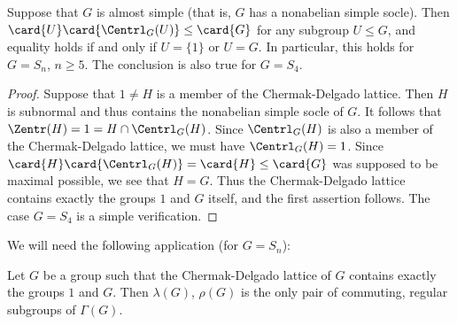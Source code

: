 \begin{lemma}\label{l:sn_cent_est}
    Suppose that $G$ is almost simple
    (that is, $G$ has a nonabelian simple
    socle). 
    Then $\card{U}\card{\Centrl_{G}(U)} \leq \card{G}$
    for any subgroup $U\leq G$,
    and equality holds if and only if
    $U = \{1\}$ or $U=G$.
    In particular, this holds for 
    $G= S_n$, $n\geq 5$.
    The conclusion is also true for $G=S_4$.
\end{lemma}

\begin{proof}
  Suppose that $1\neq H$ is a member of
  the Chermak-Delgado lattice.
  Then $H$ is subnormal and thus contains the nonabelian
  simple socle of $G$.
  It follows that $\Zentr(H)=1 = H \cap \Centrl_G(H)$.
  Since $\Centrl_G(H)$ is also a member of the Chermak-Delgado lattice,
  we must have $\Centrl_G(H)=1$.
  Since $\card{H}\card{\Centrl_G(H)} = \card{H} \leq \card{G}$
  was supposed to be maximal possible, we see that
  $H=G$.
  Thus the Chermak-Delgado lattice contains exactly the groups
  $1$ and $G$ itself,
  and the first assertion follows.
  The case $G=S_4$ is a simple verification.
\end{proof}

We will need the following application (for $G=S_n$):

\begin{lemma}\label{l:snwrc2_reg}
  Let $G$ be a group such that the Chermak-Delgado lattice of $G$
  contains exactly the groups $1$ and $G$.
  Then $\lambda(G)$, $\rho(G)$ is the only pair of
  commuting, regular subgroups of\/ $\Gamma(G)$.
\end{lemma}

